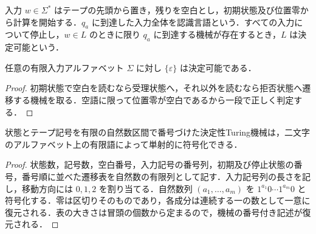 \begin{defn}[言語の認識と決定]
入力 $w\in\Sigma^*$ はテープの先頭から置き，残りを空白とし，初期状態及び位置零から計算を開始する．$q_a$ に到達した入力全体を認識言語という．すべての入力について停止し，$w\in L$ のときに限り $q_a$ に到達する機械が存在するとき，$L$ は決定可能という．
\end{defn}
\begin{prop}[空語を判定する機械]
任意の有限入力アルファベット $\Sigma$ に対し $\{\varepsilon\}$ は決定可能である．
\end{prop}
\begin{proof}
初期状態で空白を読むなら受理状態へ，それ以外を読むなら拒否状態へ遷移する機械を取る．空語に限って位置零が空白であるから一段で正しく判定する．
\end{proof}
\begin{prop}[有限記述の符号化]
状態とテープ記号を有限の自然数区間で番号づけた決定性Turing機械は，二文字のアルファベット上の有限語によって単射的に符号化できる．
\end{prop}
\begin{proof}
状態数，記号数，空白番号，入力記号の番号列，初期及び停止状態の番号，番号順に並べた遷移表を自然数の有限列として記す．入力記号列の長さを記し，移動方向には $0,1,2$ を割り当てる．自然数列 $(a_1,\ldots,a_m)$ を $1^{a_1}0\cdots1^{a_m}0$ と符号化する．零は区切りそのものであり，各成分は連続する一の数として一意に復元される．表の大きさは冒頭の個数から定まるので，機械の番号付き記述が復元される．
\end{proof}
